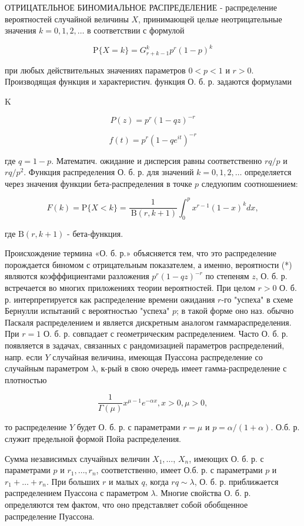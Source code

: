 \documentclass[10pt]{article}
\begin{document}
ОТРИЦАТЕЛЬНОЕ БИНОМИАЛЬНОЕ РАСПРЕДЕЛЕНИЕ - распределение вероятностей случайной величины $X$, принимающей целые неотрицательные значения $k=0,1,2, \ldots$ в соответствии с формулой

\[
\mathrm{P}\{X=k\}=G_{r+k-1}^{k} p^{r}(1-p)^{k}
\]

при любых действительных значениях параметров $0<p<1$ и $r>0$. Производящая функция и характеристич. функция О. б. р. задаются формулами

K

\[
P(z)=p^{r}(1-q z)^{-r}
\]

\[
f(t)=p^{r}\left(1-q e^{i t}\right)^{-r}
\]

где $q=1-p$. Математич. ожидание и дисперсия равны соответственно $r q / p$ и $r q / p^{2}$. Функция распределения О. б. р. для значений $k=0,1,2, \ldots$ определяется через значения функции бета-распределения в точке $p$ следуюпим соотношением:

\[
F(k)=\mathrm{P}\{X<k\}=\frac{1}{\mathrm{~B}(r, k+1)} \int_{0}^{p} x^{r-1}(1-x)^{k} d x,
\]

где $\mathrm{B}(r, k+1)$ - бета-функция.

Происхождение термина «О. б. р.» объясняется тем, что это распределение порождается биномом с отрицательным показателем, а именно, вероятности (*) являются коэфффициентами разложения $p^{r}(1-q z)^{-r}$ по степеням $z$, О. б. р. встречается во многих приложениях теории вероятностей. При целом $r>0$ О. б. р. интерпретируется как распределение времени ожидания $r$-го "успеха" в схеме Бернулли испытаний с вероятностью "успеха" $p$; в такой форме оно наз. обычно Паскаля распределением и является дискретным аналогом гаммараспределения. При $r=1$ О. б. р. совпадает с геометрическим распределением. Часто О. б. р. появляется в задачах, связанных с рандомизацией параметров распределений, напр. если $Y$ случайная величина, имеющая Пуассона распределение со случайным параметром $\lambda$, к-рый в свою очередь имеет гамма-распределение с плотностью

\[
\frac{1}{\Gamma(\mu)} x^{\mu-1} e^{-\alpha x}, x>0, \mu>0,
\]

то распределение $Y$ будет О. б. р. с параметрами $r=\mu$ и $p=\alpha /(1+\alpha)$. О.б. р. служит предельной формой Пойа распределения.

Сумма независимых случайных величин $X_{1}, \ldots$, $X_{n}$, имеющих О. б. р. с параметрами $p$ и $r_{1}, \ldots, r_{n}$, соответственно, имеет О.б. р. с параметрами $p$ и $r_{1}+\ldots+r_{n}$. При больших $r$ и малых $q$, когда $r q \sim \lambda$, О. б. р. приближается распределением Пуассона с параметром $\lambda$. Многие свойства О. б. р. определяются тем фактом, что оно представляет собой обобщенное распределение Пуассона.
\end{document}

